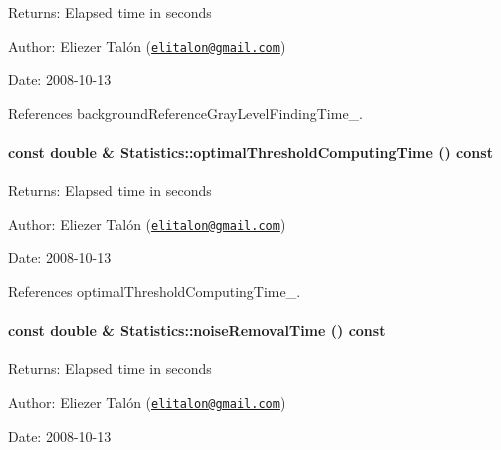 \begin{Desc}
\item[Returns:]Elapsed time in seconds\end{Desc}
\begin{Desc}
\item[Author:]Eliezer Talón (\href{mailto:elitalon@gmail.com}{\tt elitalon@gmail.com}) \end{Desc}
\begin{Desc}
\item[Date:]2008-10-13 \end{Desc}


References backgroundReferenceGrayLevelFindingTime\_\-.\hypertarget{class_statistics_87bdb5b4f7a88cb74d0072fd0c7a2248}{
\paragraph[optimalThresholdComputingTime]{\setlength{\rightskip}{0pt plus 5cm}const double \& Statistics::optimalThresholdComputingTime () const}\hfill}
\label{class_statistics_87bdb5b4f7a88cb74d0072fd0c7a2248}


\begin{Desc}
\item[Returns:]Elapsed time in seconds\end{Desc}
\begin{Desc}
\item[Author:]Eliezer Talón (\href{mailto:elitalon@gmail.com}{\tt elitalon@gmail.com}) \end{Desc}
\begin{Desc}
\item[Date:]2008-10-13 \end{Desc}


References optimalThresholdComputingTime\_\-.\hypertarget{class_statistics_ba44f1b2567a77f99ee15c11bda6312a}{
\paragraph[noiseRemovalTime]{\setlength{\rightskip}{0pt plus 5cm}const double \& Statistics::noiseRemovalTime () const}\hfill}
\label{class_statistics_ba44f1b2567a77f99ee15c11bda6312a}


\begin{Desc}
\item[Returns:]Elapsed time in seconds\end{Desc}
\begin{Desc}
\item[Author:]Eliezer Talón (\href{mailto:elitalon@gmail.com}{\tt elitalon@gmail.com}) \end{Desc}
\begin{Desc}
\item[Date:]2008-10-13 \end{Desc}


